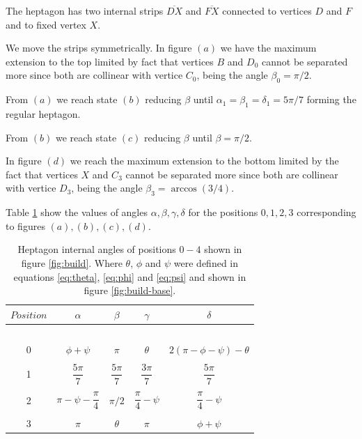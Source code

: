 \documentclass[11pt]{article}
\begin{document}
The heptagon has two internal strips $\overline{DX}$ and $\overline{FX}$ connected to vertices $D$ and $F$ and to fixed vertex $X$.

We move the strips symmetrically. In figure $(a)$ we have the maximum extension to the top limited by fact that vertices $B$ and $D_0$ cannot be separated more since both are collinear with vertice $C_0$, being the angle $\beta_0 = \pi/2$.

From $(a)$ we reach state $(b)$ reducing $\beta$ until $\alpha_1 = \beta_1 = \delta_1 = 5\pi/7$ forming the regular heptagon.

From $(b)$ we reach state $(c)$ reducing $\beta$ until $\beta= \pi/2$.

In figure $(d)$ we reach the maximum extension to the bottom limited by the fact that vertices $X$ and $C_3$ cannot be separated more since both are collinear with vertice $D_3$, being the angle $\beta_3 = \arccos(3/4)$.

Table \ref{tbl:angles} show the values of angles $\alpha,\beta,\gamma,\delta$ for the positions $0,1,2,3$ corresponding to figures $(a),(b),(c),(d)$.

\begin{table}[H]
\begin{center}
\begin{tabular}{|c|c c c c|}
\hline
$Position$ & $\alpha$ & $\beta$ & $\gamma$ & $\delta$ \\ %
\hline\
& \\[-1ex]
0 & $\phi+\psi$ & $\pi$ & $\theta$ & $2(\pi-\phi-\psi)-\theta$ \\[2ex] 
\hline
& \\[-1ex]
1 & $\dfrac{5\pi}7$ & $\dfrac{5\pi}7$ & $\dfrac{3\pi}7$ & $\dfrac{5\pi}7$ \\[2ex] 
\hline
& \\[-1ex]
2 & $\pi - \psi - \dfrac{\pi}4$ & $\pi/2$ & $\dfrac{\pi}4 - \psi$ & $\dfrac{\pi}4 - \psi$ \\[2ex] 
\hline
& \\[-1ex]
3 & $\pi$ & $\theta$ & $\pi$ & $\phi + \psi$ \\[2ex] 
\hline
\end{tabular}
\caption{Heptagon internal angles of positions $0-4$ shown in figure \ref{fig:build}.
Where $\theta$, $\phi$ and $\psi$ were defined in equations \ref{eq:theta}, \ref{eq:phi} and \ref{eq:psi} and shown in figure \ref{fig:build-base}. 
}
\label{tbl:angles}
\end{center}
\end{table}
\end{document}
